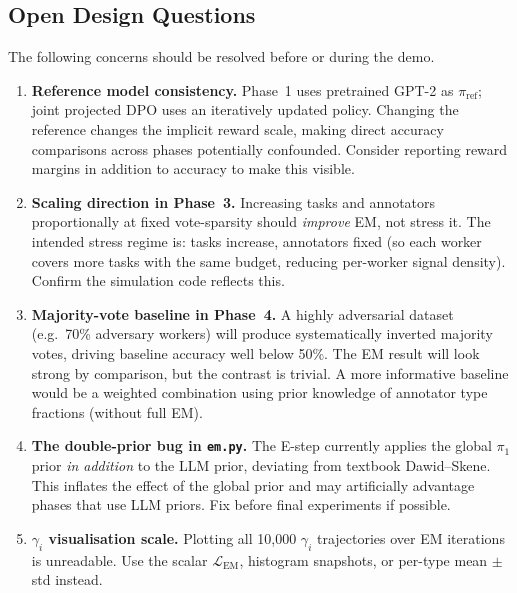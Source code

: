 \documentclass[11pt, a4paper]{article}
\begin{document}
\subsection{Open Design Questions}

The following concerns should be resolved before or during the demo.

\begin{enumerate}

  \item \textbf{Reference model consistency.}
        Phase~1 uses pretrained GPT-2 as $\pi_\text{ref}$; joint projected DPO uses an
        iteratively updated policy. Changing the reference changes the implicit reward scale,
        making direct accuracy comparisons across phases potentially confounded. Consider
        reporting reward margins in addition to accuracy to make this visible.

  \item \textbf{Scaling direction in Phase~3.}
        Increasing tasks and annotators proportionally at fixed vote-sparsity should
        \emph{improve} EM, not stress it. The intended stress regime is: tasks increase,
        annotators fixed (so each worker covers more tasks with the same budget, reducing
        per-worker signal density). Confirm the simulation code reflects this.

  \item \textbf{Majority-vote baseline in Phase~4.}
        A highly adversarial dataset (e.g.\ 70\% adversary workers) will produce
        systematically inverted majority votes, driving baseline accuracy well below 50\%.
        The EM result will look strong by comparison, but the contrast is trivial.
        A more informative baseline would be a weighted combination using prior knowledge
        of annotator type fractions (without full EM).

  \item \textbf{The double-prior bug in \texttt{em.py}.}
        The E-step currently applies the global $\pi_1$ prior \emph{in addition} to the
        LLM prior, deviating from textbook Dawid--Skene. This inflates the effect of the
        global prior and may artificially advantage phases that use LLM priors. Fix before
        final experiments if possible.

  \item \textbf{$\gamma_i$ visualisation scale.}
        Plotting all 10,000 $\gamma_i$ trajectories over EM iterations is unreadable.
        Use the scalar $\mathcal{L}_\text{EM}$, histogram snapshots, or per-type
        mean $\pm$ std instead.

\end{enumerate}
\end{document}
